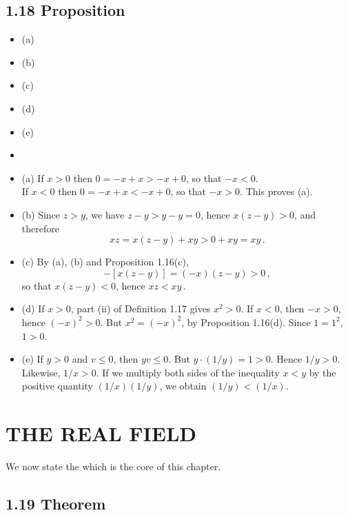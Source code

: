 \subsection*{1.18 Proposition}
\begin{itemize}
\item[] (a) 
\item[] (b)  
\item[] (c) 
\item[] (d) 
\item[] (e) 
\item[]  
\item[] (a) If $x > 0$ then $0 = -x + x > -x + 0$, so that $-x < 0$.\\
If $x < 0$ then $0 = -x + x < -x + 0$, so that $-x > 0$. This proves (a).   
\item[] (b) Since $z > y$, we have $z - y > y - y = 0$, hence $x(z - y) > 0$, and therefore 
$$xz = x (z - y) + xy > 0 + xy = xy\,.$$   
\item[] (c) By (a), (b) and Proposition 1.16(c),
$$-[x(z - y)] = (-x)(z - y) > 0\,,$$ so that $x(z - y) < 0$, hence $xz < xy\,.$  
\item[] (d) If $x > 0$, part (ii) of Definition 1.17 gives $x^2 > 0$. If $x < 0$, then $-x > 0$, hence $(-x)^2 > 0$. 
But $x^2 = (-x)^2$, by Proposition 1.16(d). Since $1 = 1^2$, $1 > 0$.     
\item[] (e) If $y > 0$ and $v \leq 0$, then $yv \leq 0$. But $y \cdot (1/y) =1 > 0$. Hence $1/y > 0$. 
Likewise, $1/x > 0$. If we multiply both sides of the inequality $x < y$ by the positive quantity 
$(1/x)(1/y)$, we obtain $(1/y) < (1/x)$.     
\end{itemize}


\section*{THE REAL FIELD}
We now state the  which is the core of this chapter.


\subsection*{1.19 Theorem}

